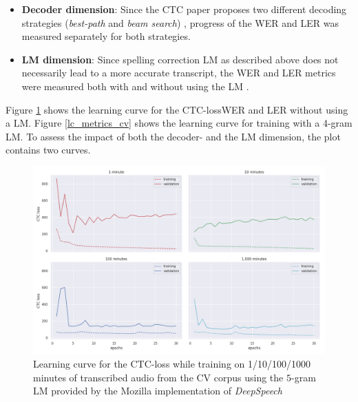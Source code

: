 \begin{itemize}
	\item \textbf{Decoder dimension}: Since the \ac{CTC} paper proposes two different decoding strategies (\textit{best-path} and \textit{beam search}) \cite{ctc_paper}, progress of the \ac{WER} and \ac{LER} was measured separately for both strategies.
	\item \textbf{LM dimension}: Since spelling correction \ac{LM} as described above does not necessarily lead to a more accurate transcript, the \ac{WER} and \ac{LER} metrics were measured both with and without using the \ac{LM} .
\end{itemize}

Figure \ref{lc_loss_cv} shows the learning curve for the \ac{CTC}-loss\ac{WER} and \ac{LER} without using a \ac{LM}. Figure \ref{lc_metrics_cv} shows the learning curve for training with a 4-gram \ac{LM}. To assess the impact of both the decoder- and the \ac{LM} dimension, the plot contains two curves.

\begin{figure}
	\includegraphics[width=\linewidth]{./img/lc_loss_cv.png}
	\caption{Learning curve for the CTC-loss while training on 1/10/100/1000 minutes of transcribed audio from the \ac{CV} corpus using the $5$-gram \ac{LM} provided by the Mozilla implementation of \textit{DeepSpeech}}
	\label{lc_loss_cv}
\end{figure}

